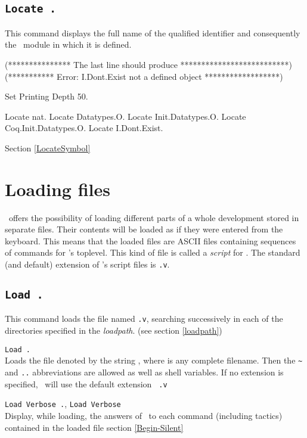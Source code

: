 
\subsection{\tt Locate {\qualid}.}
\label{Locate}
This command displays the full name of the qualified identifier {\qualid}
and consequently the \Coq\ module in which it is defined.

\begin{coq_eval}
(*************** The last line should produce **************************)
(*********** Error: I.Dont.Exist not a defined object ******************)
\end{coq_eval}
\begin{coq_eval}
Set Printing Depth 50.
\end{coq_eval}
\begin{coq_example}
Locate nat.
Locate Datatypes.O.
Locate Init.Datatypes.O.
Locate Coq.Init.Datatypes.O.
Locate I.Dont.Exist.
\end{coq_example}

\SeeAlso Section \ref{LocateSymbol}

\section{Loading files}

\Coq\ offers the possibility of loading different
parts of a whole development stored in separate files. Their contents
will be loaded as if they were entered from the keyboard. This means
that the loaded files are ASCII files containing sequences of commands
for \Coq's toplevel. This kind of file is called a {\em script} for
\Coq{}. The standard (and default) extension of
\Coq's script files is {\tt .v}.

\subsection{\tt Load {\ident}.}
\label{Load}
This command loads the file named {\ident}{\tt .v}, searching
successively in each of the directories specified in the {\em
  loadpath}. (see section \ref{loadpath})

\begin{Variants}
\item {\tt Load {\str}.}\label{Load-str}\\
  Loads the file denoted by the string {\str}, where {\str} is any
  complete filename. Then the \verb.~. and {\tt ..}
  abbreviations are allowed as well as shell variables. If no
  extension is specified, \Coq\ will use the default extension {\tt
    .v}
\item {\tt Load Verbose {\ident}.}, 
  {\tt Load Verbose {\str}}\\
  Display, while loading, the answers of \Coq\ to each command
  (including tactics) contained in the loaded file
  \SeeAlso section \ref{Begin-Silent}
\end{Variants}

